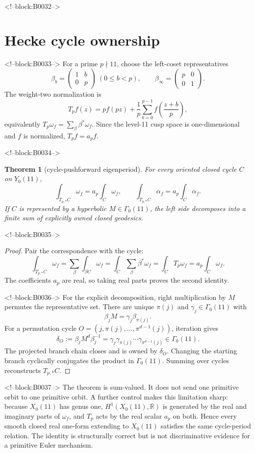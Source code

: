 \documentclass[11pt]{article}
\newtheorem{theorem}{Theorem}[section]
\theoremstyle{definition}
\theoremstyle{remark}
\newcommand{\G}{\Gamma_0(11)}
\newcommand{\RR}{\mathbb R}
\begin{document}
<!--block:B0032-->
\section{Hecke cycle ownership}

<!--block:B0033-->
For a prime $p\nmid11$, choose the left-coset representatives
\[
\beta_b=\begin{pmatrix}1&b\\0&p\end{pmatrix}\ (0\leq b<p),
\qquad
\beta_\infty=\begin{pmatrix}p&0\\0&1\end{pmatrix}.
\]
The weight-two normalization is
\[
T_pf(z)=pf(pz)+\frac1p\sum_{b=0}^{p-1}f\!\left(\frac{z+b}{p}\right),
\]
equivalently $T_p\omega_f=\sum_\beta\beta^*\omega_f$. Since the level-11 cusp space is one-dimensional and $f$ is normalized, $T_pf=a_pf$.

<!--block:B0034-->
\begin{theorem}[cycle-pushforward eigenperiod]\label{thm:hecke}
For every oriented closed cycle $C$ on $Y_0(11)$,
\[
\int_{T_{p,*}C}\omega_f=a_p\int_C\omega_f,
\qquad
\int_{T_{p,*}C}\alpha_f=a_p\int_C\alpha_f.
\]
If $C$ is represented by a hyperbolic $M\in\G$, the left side decomposes into a finite sum of explicitly owned closed geodesics.
\end{theorem}

<!--block:B0035-->
\begin{proof}
Pair the correspondence with the cycle:
\[
\int_{T_{p,*}C}\omega_f
=\sum_\beta\int_{\beta C}\omega_f
=\int_C\sum_\beta\beta^*\omega_f
=\int_CT_p\omega_f
=a_p\int_C\omega_f.
\]
The coefficients $a_p$ are real, so taking real parts proves the second identity.

<!--block:B0036-->
For the explicit decomposition, right multiplication by $M$ permutes the representative set. There are unique $\pi(j)$ and $\gamma_j\in\G$ with
\[
\beta_jM=\gamma_j\beta_{\pi(j)}.
\]
For a permutation cycle $O=(j,\pi(j),\ldots,\pi^{d-1}(j))$, iteration gives
\[
\delta_O:=\beta_jM^d\beta_j^{-1}
=\gamma_j\gamma_{\pi(j)}\cdots\gamma_{\pi^{d-1}(j)}\in\G.
\]
The projected branch chain closes and is owned by $\delta_O$. Changing the starting branch cyclically conjugates the product in $\G$. Summing over cycles reconstructs $T_{p,*}C$.
\end{proof}

<!--block:B0037-->
The theorem is sum-valued. It does not send one primitive orbit to one primitive orbit. A further control makes this limitation sharp: because $X_0(11)$ has genus one, $H^1(X_0(11),\RR)$ is generated by the real and imaginary parts of $\omega_f$, and $T_p$ acts by the real scalar $a_p$ on both. Hence every smooth closed real one-form extending to $X_0(11)$ satisfies the same cycle-period relation. The identity is structurally correct but is not discriminative evidence for a primitive Euler mechanism.
\end{document}
